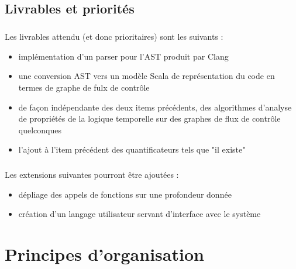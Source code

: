 \documentclass{report}
\begin{document}
\section{Livrables et priorit\'{e}s}

\paragraph{}
\hspace{4mm}\textnormal{Les livrables attendu (et donc prioritaires) sont les suivants :}

\vspace{4mm}
\begin{itemize}
\item impl\'{e}mentation d'un parser pour l'AST produit par Clang\vspace{1mm}
\item une conversion AST vers un mod\`{e}le Scala de repr\'{e}sentation du code en termes de graphe de fulx de contr\^{o}le\vspace{1mm}
\item de fa\c{c}on ind\'{e}pendante des deux items pr\'{e}c\'{e}dents, des algorithmes d'analyse de propri\'{e}t\'{e}s de la logique temporelle sur des graphes de flux de contr\^{o}le
quelconques\vspace{1mm}
\item l'ajout \`{a} l'item pr\'{e}c\'{e}dent des quantificateurs tels que "il existe"\vspace{1mm}
\end{itemize}

\paragraph{}
\hspace{4mm}\textnormal{Les extensions suivantes pourront \^{e}tre ajout\'{e}es :}

\vspace{4mm}
\begin{itemize}
\item d\'{e}pliage des appels de fonctions sur une profondeur donn\'{e}e\vspace{1mm}
\item cr\'{e}ation d'un langage utilisateur servant d'interface avec le syst\`{e}me\vspace{1mm}
\end{itemize}

\chapter{Principes d'organisation}
\end{document}
